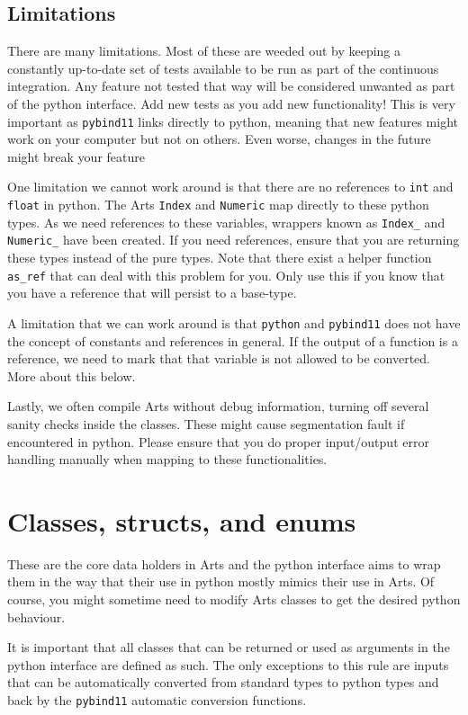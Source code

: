 \subsection{Limitations}
There are many limitations.  Most of these are weeded out by keeping a constantly up-to-date set of tests available to be run as part of the continuous
integration.  Any feature not tested that way will be considered unwanted as part of the python interface.  Add new tests as you add new functionality!
This is very important as \verb|pybind11| links directly to python, meaning that new features might work on your computer but not on others.  Even worse,
changes in the future might break your feature

One limitation we cannot work around is that there are no references to \verb|int| and \verb|float| in python.  The 
Arts \verb|Index| and \verb|Numeric| map directly to these python types.  As we need references to these variables,
wrappers known as \verb|Index_| and \verb|Numeric_| have been created.  If you need references, ensure that you are returning
these types instead of the pure types.  Note that there exist a helper function \verb|as_ref| that can deal with this problem
for you.  Only use this if you know that you have a reference that will persist to a base-type.

A limitation that we can work around is that \verb|python| and \verb|pybind11| does not have the concept of constants and
references in general.  If the output of a function is a reference, we need to mark that that variable is not allowed to
be converted.  More about this below.

Lastly, we often compile Arts without debug information, turning off several sanity checks inside the classes.
These might cause segmentation fault if encountered in python.  Please ensure that you do proper input/output
error handling manually when mapping to these functionalities.

\section{Classes, structs, and enums}
These are the core data holders in Arts and the python interface aims to wrap them in the way that their use in
python mostly mimics their use in Arts.  Of course, you might sometime need to modify Arts classes to get the
desired python behaviour.

It is important that all classes that can be returned or used as arguments in the python interface are defined as such.
The only exceptions to this rule are inputs that can be automatically converted from standard types to python types
and back by the \verb|pybind11| automatic conversion functions.

